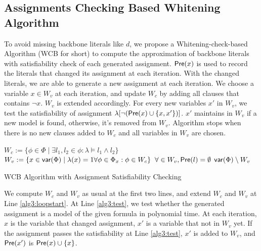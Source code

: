 \medskip

\subsection{Assignments Checking Based Whitening Algorithm}

To avoid missing backbone literals like $d$, we propose a Whitening-check-based Algorithm (WCB for short) to compute the approximation of backbone literals with satisfiability check of each generated assignment. $\textsf{Pre}(x)$ is used to record the literals that changed its assignment at each iteration. With the changed literals, we are able to generate a new assignment at each iteration. We choose a variable $x\in W_v$ at each iteration, and update $W_c$ by adding all clauses that contains $\neg x$. $W_v$ is extended accordingly. For every new variables $x'$ in $W_v$, we test the satisfiability of assignment $\lambda[\neg (\textsf{Pre}(x)\cup\{x,x'\})]$. $x'$ maintains in $W_v$ if a new model is found, otherwise, it's removed from $W_v$. Algorithm stops when there is no new clauses added to $W_c$ and all variables in $W_v$ are chosen.


\begin{algorithm2e}
\SetAlgoShortEnd
\SetFillComment
{}
$W_c:=\{\phi\in\Phi\mid \exists l_1,l_2\in\phi: \lambda\models l_1\wedge l_2\}$\;\label{alg3:l1}
$W_v:=\{x\in\textsf{var}(\Phi) \mid \lambda(x)=1 \forall\phi\in\Phi_x: \phi\in W_c\}$\; \label{alg3:l2}
$\forall \in W_v, \textsf{Pre}(l)=\emptyset$\;
\label{alg3:loopend}
\Return $\textsf{var}(\Phi)\setminus W_v$\;
\caption{WCB Algorithm with Assignment Satisfiability Checking}
\label{alg:ewhite}
\end{algorithm2e}

We compute $W_c$ and $W_v$ as usual at the first two lines, and extend $W_c$ and $W_v$ at Line \ref{alg3:loopstart}. At Line \ref{alg3:test}, we test whether the generated assignment is a model of the given formula in polynomial time. At each iteration, $x$ is the variable that changed assignment, $x'$ is a variable that not in $W_v$ yet. If the assignment passes the satisfiability at Line \ref{alg3:test}, $x'$ is added to $W_v$, and $\textsf{Pre}(x')$ is $\textsf{Pre}(x)\cup \{x\}$.

